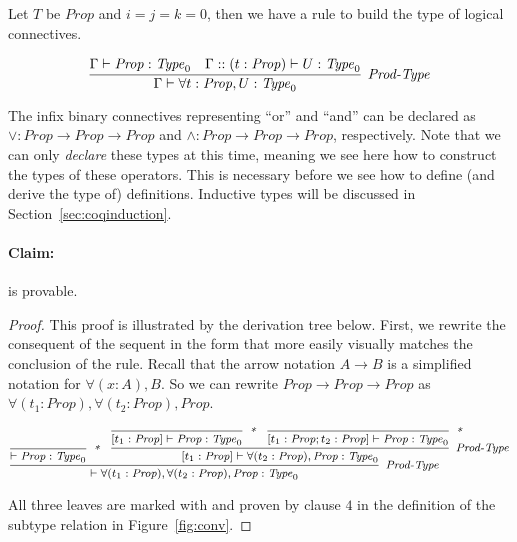\begin{expl}

Let $T$ be $\mathit{Prop}$ and $i=j=k=0$, then we have a rule to build the type of logical connectives.

$$
\infer[\rl{Prod-Type}]{\seq{\forall t : \mathit{Prop}, U : \mathit{Type}_0}}{\seq{\mathit{Prop} : \mathit{Type}_0} & \seq[\Gamma :: (t : \mathit{Prop})]{U : \mathit{Type}_0}}
$$

The infix binary connectives representing ``or'' and ``and'' can be declared as $\vee : \mathit{Prop} \rightarrow \mathit{Prop} \rightarrow \mathit{Prop}$ and $\wedge : \mathit{Prop} \rightarrow \mathit{Prop} \rightarrow \mathit{Prop}$, respectively.
Note that we can only \emph{declare} these types at this time, meaning we see here how to construct the types of these operators. This is necessary before we see how to define (and derive the type of) definitions. Inductive types will be discussed in Section~\ref{sec:coqinduction}.

\paragraph{Claim:}  is provable.

\begin{proof}

This proof is illustrated by the derivation tree below. First, we rewrite the consequent of the sequent in the form that more easily visually matches the conclusion of the  rule. Recall that the arrow notation $A \rightarrow B$ is a simplified notation for $\forall (x : A), B$. So we can rewrite $\mathit{Prop} \rightarrow \mathit{Prop} \rightarrow \mathit{Prop}$ as $\forall (t_1 : \mathit{Prop}), \forall (t_2 : \mathit{Prop}), Prop$.

$$
{\footnotesize
\infer[\rl{Prod-Type}]{\seq[]{\forall (t_1 : \mathit{Prop}), \forall (t_2 : \mathit{Prop}), \mathit{Prop} : \mathit{Type}_0}}{
    \infer[\rl{*}]{\seq[]{\mathit{Prop} : \mathit{Type}_0}}{}
    &
    \infer[\rl{Prod-Type}]{\seq[{[t_1 : \mathit{Prop}]}]{\forall (t_2 : \mathit{Prop}), \mathit{Prop} : \mathit{Type}_0}}{
      \infer[\rl{*}]{\seq[{[t_1 : \mathit{Prop}]}]{\mathit{Prop} : \mathit{Type}_0}}{}
      &
      \infer[\rl{*}]{\seq[{[t_1 : \mathit{Prop} ; t_2 : \mathit{Prop}]}]{\mathit{Prop} : \mathit{Type}_0}}{}
    }
}
}
$$

All three leaves are marked with \rl{*} and proven by clause $4$ in the definition of the subtype relation in Figure~\ref{fig:conv}.

\end{proof}

\end{expl}


